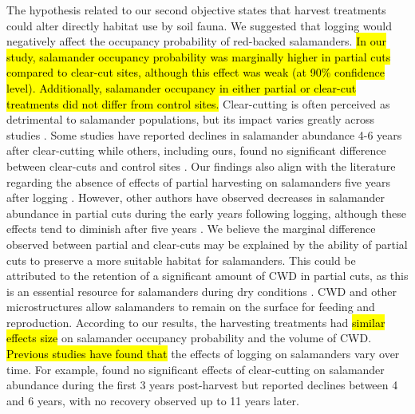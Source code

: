 The hypothesis related to our second objective states that harvest treatments could alter directly habitat use by soil fauna. 
We suggested that logging would negatively affect the occupancy probability of red-backed salamanders. 
\hl{In our study, salamander occupancy probability was marginally higher in partial cuts compared to clear-cut sites, although this effect was weak (at 90\% confidence level). 
Additionally, salamander occupancy in either partial or clear-cut treatments did not differ from control sites.}
Clear-cutting is often perceived as detrimental to salamander populations, but its impact varies greatly across studies \citep{Hocking2013Effectsexperimental,Chaudhary2016Impactforest}. 
Some studies have reported declines in salamander abundance 4-6 years after clear-cutting \citep{Petranka1993Effectstimber,Herbeck1999PlethodontidSalamander,Grialou2000effectsforest,Macneil2014Effectstimber}  
while others, including ours, found no significant difference between clear-cuts and control sites \citep{Renken2004EffectsForest,Mazerolle2021Woodlandsalamander}. 
Our findings also align with the literature regarding the absence of effects of partial harvesting on salamanders five years after logging \citep{McKenny2006Effectsstructural,Mazerolle2021Woodlandsalamander,Ochs2022Responseterrestrial}. 
However, other authors have observed decreases in salamander abundance in partial cuts during the early years following logging, although these effects tend to diminish after five years \citep{Harpole1999Effectsseven,Knapp2003Initialeffects,Morneault2004effectshelterwood}.  
We believe the marginal difference observed between partial and clear-cuts may be explained by the ability of partial cuts to preserve a more suitable habitat for salamanders. 
This could be attributed to the retention of a significant amount of CWD in partial cuts, as this is an essential resource for salamanders during dry conditions \citep{Nolet2018Comparingeffects,Peterman2014Spatialvariation,Achat2015Quantifyingconsequences,Peele2017Effectswoody}.  
CWD and other microstructures allow salamanders to remain on the surface for feeding and reproduction. 
According to our results, the harvesting treatments had \hl{similar effects size} on salamander occupancy probability and the volume of CWD. 
\hl{Previous studies have found that} the effects of logging on salamanders vary over time. 
For example, \cite{Ochs2022Responseterrestrial} found no significant effects of clear-cutting on salamander abundance during the first 3 years post-harvest but reported declines between 4 and 6 years, with no recovery observed up to 11 years later. 
